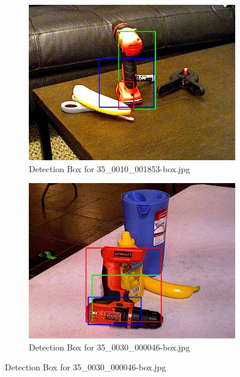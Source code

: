 \documentclass[10.5pt,a4paper]{article}
\begin{document}
    \clearpage
    
    \begin{figure}
    \begin{subfigure}{0.45\textwidth}
        \centering
        \includegraphics[width=\textwidth]{img/35_0010_001853-box.jpg}
        \caption{Detection Box for 35\_0010\_001853-box.jpg}
        \label{fig:img25}
    \end{subfigure}
    \hfill
    \begin{subfigure}{0.45\textwidth}
        \centering
        \includegraphics[width=\textwidth]{img/35_0030_000046-box.jpg}
        \caption{Detection Box for 35\_0030\_000046-box.jpg}
        \label{fig:img26}
    \end{subfigure}


\end{figure}
\end{document}
